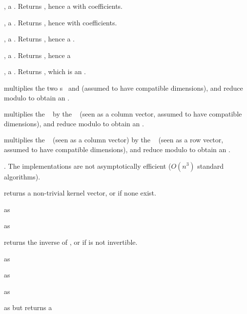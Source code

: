 ,  a . Returns , hence a  with  coefficients.

,  a . Returns , hence with  coefficients.

,  a . Returns , hence a .

,  a . Returns , hence a 

,  a . Returns , which is an .

 multiplies the two s~
and  (assumed to have compatible dimensions), and reduce modulo
 to obtain an .

 multiplies the ~
by the ~ (seen as a column vector, assumed to have compatible
dimensions), and reduce modulo  to obtain an .  

 multiplies the ~
(seen as a column vector) by the ~ (seen as a row vector,
assumed to have compatible dimensions), and reduce modulo  to obtain
an .

. The implementations are not
asymptotically efficient ($O(n^3)$ standard algorithms).

 returns a non-trivial kernel vector,
or  if none exist.

 as 

 as 

 returns the inverse of , or
 if  is not invertible.

 as 

 as 

 as 

 as  but returns a

